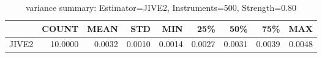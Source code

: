 \begin{table}[ht]
\centering
\caption{variance summary: Estimator=JIVE2, Instruments=500, Strength=0.80}
\begin{tabular}{lrrrrrrrr}
\toprule
 & COUNT & MEAN & STD & MIN & 25\% & 50\% & 75\% & MAX \\
\midrule
JIVE2 & 10.0000 & 0.0032 & 0.0010 & 0.0014 & 0.0027 & 0.0031 & 0.0039 & 0.0048 \\
\bottomrule
\end{tabular}
\end{table}
